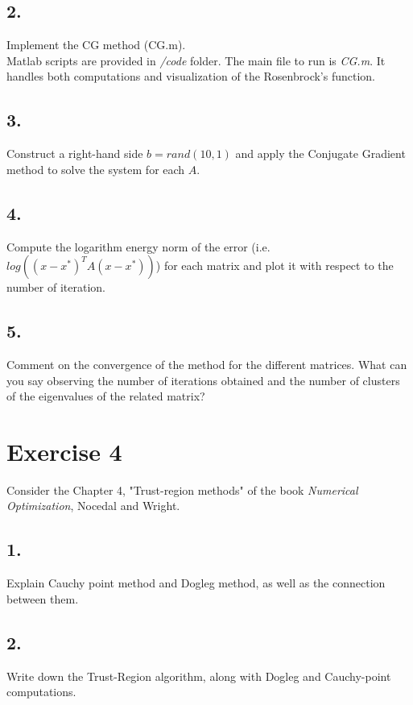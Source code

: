 \documentclass[unicode,11pt,a4paper,oneside,numbers=endperiod,openany]{scrartcl}
\begin{document}
\subsection*{2.}
Implement the CG method (CG.m).\\



Matlab scripts are provided in \textit{/code} folder.
The main file to run is \textit{CG.m}.
It handles both computations and visualization of the Rosenbrock's function.

\subsection*{3.}
Construct a right-hand side $b = rand(10,1)$ and apply the Conjugate Gradient method to solve the
system for each $A$.

\subsection*{4.}
Compute the logarithm energy norm of the error (i.e. $log((x - x^*)^T A(x - x^*))$)
for each matrix and plot it with respect to the number of iteration.

\subsection*{5.}
Comment on the convergence of the method for the different matrices.
What can you say observing the number of iterations obtained
and the number of clusters of the eigenvalues of the related matrix?


\section*{Exercise 4}
Consider the Chapter 4, "Trust-region methods" of the book \textit{Numerical Optimization},
Nocedal and Wright.

\subsection*{1.}
Explain  Cauchy point method and Dogleg method, as well as the connection between them.

\subsection*{2.}
Write down the Trust-Region algorithm, along with Dogleg and Cauchy-point computations.
\end{document}
